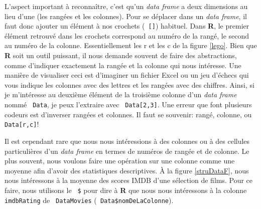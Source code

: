 \documentclass[10.5pt,a4paper]{article}
\newcommand{\rcode}[1]{\texttt{\color{rstudio} #1}}
\begin{document}
    
    L'aspect important à reconnaître, c'est qu'un \emph{data frame} a deux dimensions au lieu d'une (les rangées et les colonnes). Pour se déplacer dans un \emph{data frame}, il faut donc ajouter un élément à nos crochets (\rcode{[]}) habituel. Dans \textbf{R}, le premier élément retrouvé dans les crochets correspond au numéro de la rangé, le second au numéro de la colonne. Essentiellement les r et les c de la figure \ref{lego}. Bien que \textbf{R} soit un outil puissant, il nous demande souvent de faire des abstractions, comme d'indiquer exactement la rangée et la colonne qui nous intéresse. Une manière de visualiser ceci est d'imaginer un fichier Excel ou un jeu d'échecs qui vous indique les colonnes avec des lettres et les rangées avec des chiffres. Ainsi, si je m'intéresse au deuxième élément de la troisième colonne d'un \emph{data frame} nommé \rcode{Data}, je peux l'extraire avec \rcode{Data[2,3]}. Une erreur que font plusieurs codeurs est d'inverser rangées et colonnes. Il faut se souvenir: rangé, colonne, ou \rcode{Data[r,c]}!
    
    Il est cependant rare que nous nous intéressions à des colonnes ou à des cellules particulières d'un \emph{data frame} en termes de numéros de rangée et de colonne. Le plus souvent, nous voulons faire une opération sur une colonne comme une moyenne afin d'avoir des statistiques descriptives. À la figure \ref{struDataF}, nous nous intéressons à la moyenne des scores IMDB d'une sélection de films. Pour ce faire, nous utilisons le \rcode{\$} pour dire à \textbf{R} que nous nous intéressons à la colonne \rcode{imdbRating} de \rcode{DataMovies} (\rcode{Data\$nomDeLaColonne}).
    
\end{document}
